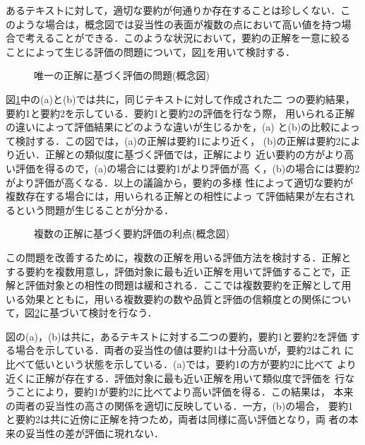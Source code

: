 あるテキストに対して，適切な要約が何通りか存在することは珍しくない．こ
のような場合は，概念図では妥当性の表面が複数の点において高い値を持つ場
合で考えることができる．このような状況において，要約の正解を一意に絞る
ことによって生じる評価の問題について，図\ref{problem}を用いて検討する．

\begin{figure}
\begin{center}
\caption{唯一の正解に基づく評価の問題(概念図)}
\label{problem}
\end{center}
\end{figure}

図\ref{problem}中の(a)と(b)では共に，同じテキストに対して作成された二
つの要約結果，要約1と要約2を示している．要約1と要約2の評価を行なう際，
用いられる正解の違いによって評価結果にどのような違いが生じるかを，(a)
と(b)の比較によって検討する．この図では，(a)の正解は要約1により近く，
(b)の正解は要約2により近い．正解との類似度に基づく評価では，正解により
近い要約の方がより高い評価を得るので，(a)の場合には要約1がより評価が高
く，(b)の場合には要約2がより評価が高くなる．以上の議論から，要約の多様
性によって適切な要約が複数存在する場合には，用いられる正解との相性によっ
て評価結果が左右されるという問題が生じることが分かる．

\begin{figure}
\begin{center}
\caption{複数の正解に基づく要約評価の利点(概念図)}
\label{proposed-method}
\end{center}
\end{figure}

この問題を改善するために，複数の正解を用いる評価方法を検討する．正解と
する要約を複数用意し，評価対象に最も近い正解を用いて評価することで，正
解と評価対象との相性の問題は緩和される．ここでは複数要約を正解として用
いる効果とともに，用いる複数要約の数や品質と評価の信頼度との関係につい
て，図\ref{proposed-method}に基づいて検討を行なう．

図の(a)，(b)は共に，あるテキストに対する二つの要約，要約1と要約2を評価
する場合を示している．両者の妥当性の値は要約1は十分高いが，要約2はこれ
に比べて低いという状態を示している．(a)では，要約1の方が要約2に比べて
より近くに正解が存在する．評価対象に最も近い正解を用いて類似度で評価を
行なうことにより，要約1が要約2に比べてより高い評価を得る．この結果は，
本来の両者の妥当性の高さの関係を適切に反映している．一方，(b)の場合，
要約1と要約2は共に近傍に正解を持つため，両者は同様に高い評価となり，両
者の本来の妥当性の差が評価に現れない．

